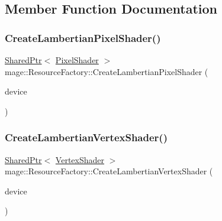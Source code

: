 \subsection{Member Function Documentation}
\hypertarget{classmage_1_1_resource_factory_a85ca9708851c325317a17d698f54bc02}{}\label{classmage_1_1_resource_factory_a85ca9708851c325317a17d698f54bc02} 
\subsubsection{\texorpdfstring{Create\+Lambertian\+Pixel\+Shader()}{CreateLambertianPixelShader()}}
{\footnotesize\ttfamily \hyperlink{namespacemage_a1e01ae66713838a7a67d30e44c67703e}{Shared\+Ptr}$<$ \hyperlink{classmage_1_1_pixel_shader}{Pixel\+Shader} $>$ mage\+::\+Resource\+Factory\+::\+Create\+Lambertian\+Pixel\+Shader (\begin{DoxyParamCaption}\item[{\hyperlink{namespacemage_ae74f374780900893caa5555d1031fd79}{Com\+Ptr}$<$ I\+D3\+D11\+Device2 $>$}]{device }\end{DoxyParamCaption})}

\hypertarget{classmage_1_1_resource_factory_a06490ac366baeff47fcd708fa83e24ae}{}\label{classmage_1_1_resource_factory_a06490ac366baeff47fcd708fa83e24ae} 
\subsubsection{\texorpdfstring{Create\+Lambertian\+Vertex\+Shader()}{CreateLambertianVertexShader()}}
{\footnotesize\ttfamily \hyperlink{namespacemage_a1e01ae66713838a7a67d30e44c67703e}{Shared\+Ptr}$<$ \hyperlink{classmage_1_1_vertex_shader}{Vertex\+Shader} $>$ mage\+::\+Resource\+Factory\+::\+Create\+Lambertian\+Vertex\+Shader (\begin{DoxyParamCaption}\item[{\hyperlink{namespacemage_ae74f374780900893caa5555d1031fd79}{Com\+Ptr}$<$ I\+D3\+D11\+Device2 $>$}]{device }\end{DoxyParamCaption})}

